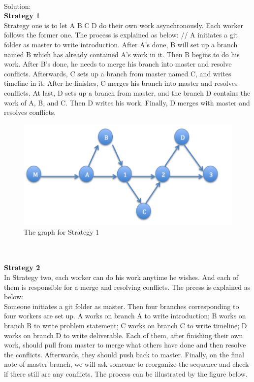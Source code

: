 \documentclass[12pt]{article}
\begin{document}
\newpage
\noindent\ \\Solution:\\
\textbf{Strategy 1}\\
Strategy one is to let A B C D do their own work asynchronously. Each worker follows the former one. The process is explained as below: 
//
 A initiates a git folder as master to write introduction. After A\textquoteright s done, B will set up a branch named B which has already contained A\textquoteright s work in it. Then B begins to do his work. After B\textquoteright s done, he needs to merge his branch into master and resolve conflicts. Afterwards, C sets up a branch from master named C, and writes timeline in it. After he finishes, C merges his branch into master and resolves conflicts. At last, D sets up a branch from master, and the branch D contains the work of A, B, and C. Then D writes his work. Finally, D merges with master and resolves conflicts. 
\begin{figure}[h]
    \begin{center}
        \includegraphics[scale=0.6]{s1.png}
    \end{center}
    \caption{The graph for Strategy 1}
    \label{fig:branch}
\end{figure}
\\
\\
\textbf{Strategy 2}\\
In Strategy two, each worker can do his work anytime he wishes. And each of them is responsible for a merge and resolving conflicts. The prcess is explained as below: 
\\
Someone initiates a git folder as master. Then four branches corresponding to four workers are set up. A works on branch A to write introduction; B works on branch B to write problem statement; C works on branch C to write timeline; D works on branch D to write deliverable. Each of them, after finishing their own work, should pull from master to merge what others have done and then resolve the conflicts. Afterwards, they should push back to master. Finally, on the final note of master branch, we will ask someone to reorganize the sequence and check if there still are any conflicts. The process can be illustrated by the figure below.
\end{document}
